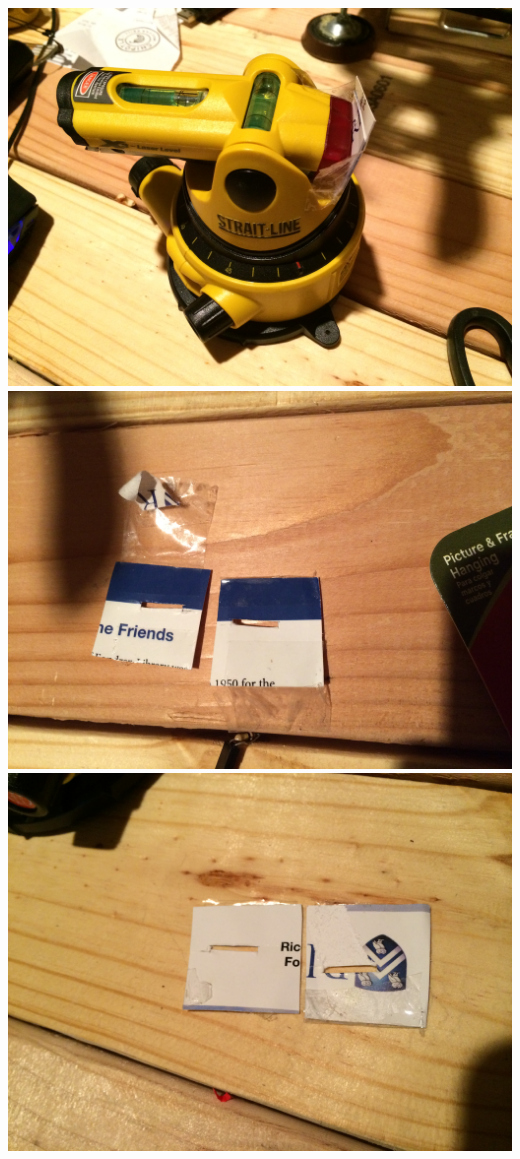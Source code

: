 \documentclass[12pt]{article}
\begin{document}
\includegraphics[scale=0.1,angle=270]{images/volume_analysis_setup/IMG_0607.JPG}
\includegraphics[scale=0.1,angle=270]{images/volume_analysis_setup/IMG_0608.JPG}
\includegraphics[scale=0.1,angle=270]{images/volume_analysis_setup/IMG_0609.JPG}
\end{document}
